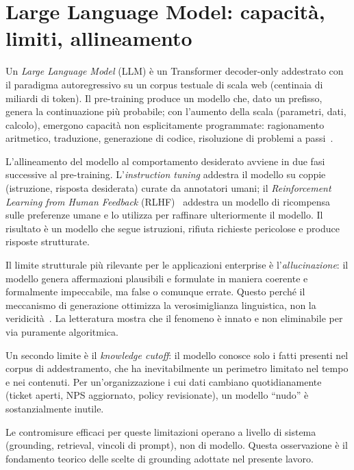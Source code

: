 \section{Large Language Model: capacità, limiti, allineamento}
\label{sec:bg-llm}

Un \emph{Large Language Model} (LLM) è un Transformer decoder-only addestrato con il paradigma autoregressivo 
su un corpus testuale di scala web (centinaia di miliardi di token). 
Il pre-training produce un modello che, dato un prefisso, genera la continuazione più probabile; 
con l'aumento della scala (parametri, dati, calcolo), emergono capacità non esplicitamente programmate: 
ragionamento aritmetico, traduzione, generazione di codice, risoluzione di problemi a passi~\cite{brown2020gpt3}.

L'allineamento del modello al comportamento desiderato avviene in due fasi successive al pre-training. 
L'\emph{instruction tuning} addestra il modello su coppie (istruzione, risposta desiderata) curate da annotatori umani; 
il \emph{Reinforcement Learning from Human Feedback} (RLHF)~\cite{ouyang2022instructgpt} addestra un modello di ricompensa 
sulle preferenze umane e lo utilizza per raffinare ulteriormente il modello. 
Il risultato è un modello che segue istruzioni, rifiuta richieste pericolose e produce risposte strutturate.

Il limite strutturale più rilevante per le applicazioni enterprise è l'\emph{allucinazione}: 
il modello genera affermazioni plausibili e formulate in maniera coerente e formalmente impeccabile,
ma false o comunque errate.
Questo perché il meccanismo di generazione ottimizza la verosimiglianza linguistica, non la veridicità~\cite{xu2024hallucination}. 
La letteratura mostra che il fenomeno è innato e non eliminabile per via puramente algoritmica.

Un secondo limite è il \emph{knowledge cutoff}: il modello conosce solo i fatti presenti nel corpus di addestramento, 
che ha inevitabilmente un perimetro limitato nel tempo e nei contenuti. 
Per un'organizzazione i cui dati cambiano quotidianamente (ticket aperti, NPS aggiornato, policy revisionate), 
un modello ``nudo'' è sostanzialmente inutile. 

Le contromisure efficaci per queste limitazioni operano a livello di sistema (grounding, retrieval, vincoli di prompt), non di modello. 
Questa osservazione è il fondamento teorico delle scelte di grounding adottate nel presente lavoro.

